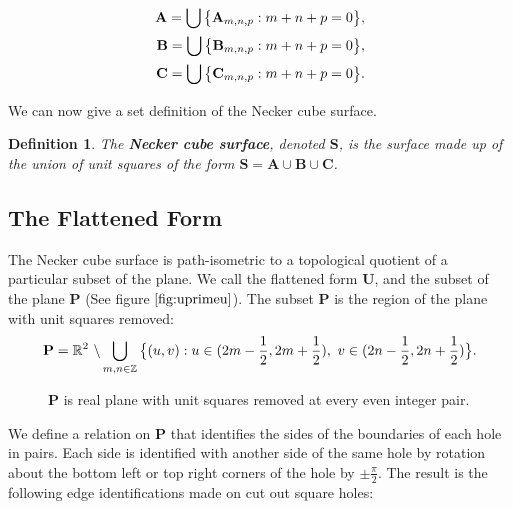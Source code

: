 \documentclass[]{article}
\newtheorem{Def}{Definition}[section]
\begin{document}
\begin{align*}
\mathbf{A}=\bigcup\big{\{}\mathbf{A}_{m,n,p}: m+n+p=0\big{\}},
\\\mathbf{B}=\bigcup\big{\{}\mathbf{B}_{m,n,p}: m+n+p=0\big{\}},
\\\mathbf{C}=\bigcup\big{\{}\mathbf{C}_{m,n,p}: m+n+p=0\big{\}}.
\end{align*}

\noindent We can now give a set definition of the Necker cube surface.

\begin{Def} The \textbf{Necker cube surface}, denoted $\mathbf{S}$, is the surface made up of the union of unit squares of the form $\mathbf{S} = \mathbf{A}\cup\mathbf{B}\cup\mathbf{C}$.\end{Def}

\subsection{The Flattened Form}
The Necker cube surface is path-isometric to a topological quotient of a particular subset of the plane. We call the flattened form $\mathbf{U}$, and the subset of the plane $\mathbf P$ (See figure $\ref{fig:uprimeu}$).
The subset $\mathbf P$ is the region of the plane with unit squares removed:
\begin{equation}
\label{eq:P}
\mathbf{P} = \mathbb{R}^{2}\text{ }\backslash\bigcup_{m,n \in {\mathbb Z}} \big{\{}(u,v):u\in(2m-\frac{1}{2},2m+\frac{1}{2}),\text{ } v\in(2n-\frac{1}{2},2n+\frac{1}{2})\big{\}}.
\end{equation}

\begin{figure}[H]
\begin{center}

\end{center}
\caption{$\mathbf P$ is real plane with unit squares removed at every even integer pair.}
\label{fig:uprimeu}
\end{figure}

\noindent We define a relation on $\mathbf P$ that identifies the sides of the boundaries of each hole in pairs. Each side is identified with another side of the same hole by rotation about the bottom left or top right corners of the hole by $\pm\frac{\pi}{2}$. The result is the following edge identifications made on cut out square holes: 

\begin{figure}[H]\centering

\end{figure}
\end{document}
